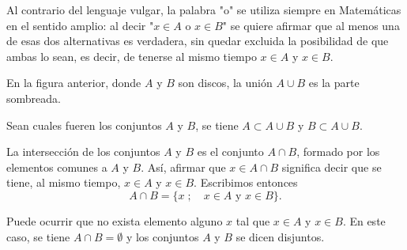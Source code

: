 \documentclass[12pt,oneside]{book}
\begin{document}
Al contrario del lenguaje vulgar, la palabra "o" se utiliza siempre en Matemáticas en el sentido amplio: al decir "\(x \in A\) o \(x \in B\)" se quiere afirmar que al menos una de esas dos alternativas es verdadera, sin quedar excluida la posibilidad de que ambas lo sean, es decir, de tenerse al mismo tiempo \(x \in A\) y \(x \in B\).

\begin{center}
\end{center}

En la figura anterior, donde \(A\) y \(B\) son discos, la unión \(A \cup B\) es la parte sombreada.

Sean cuales fueren los conjuntos \(A\) y \(B\), se tiene \(A \subset A \cup B\) y \(B \subset A \cup B\).

La intersección de los conjuntos \(A\) y \(B\) es el conjunto \(A \cap B\), formado por los elementos comunes a \(A\) y \(B\). Así, afirmar que \(x \in A \cap B\) significa decir que se tiene, al mismo tiempo, \(x \in A\) y \(x \in B\). Escribimos entonces
\[
A \cap B = \{x \; ; \quad x \in A \text{ y } x \in B\}.
\]

Puede ocurrir que no exista elemento alguno \(x\) tal que \(x \in A\) y \(x \in B\). En este caso, se tiene \(A \cap B = \emptyset\) y los conjuntos \(A\) y \(B\) se dicen disjuntos.
\end{document}
